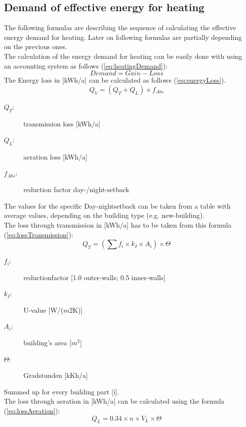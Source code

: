 \subsection{Demand of effective energy for heating}
The following formulas are describing the sequence of calculating the effective energy demand for heating. Later on following formulas are partially depending on the previous ones.\\
The calculation of the energy demand for heating can be easily done with using an accounting system as follows (\ref{eq:heatingDemand}):
\begin{equation}
Demand = Gain - Loss
\label{eq:heatingDemand}
\end{equation}
The Energy loss in [kWh/a] can be calculated as follows (\ref{eq:energyLoss}). 
\begin{equation}
Q_{V} = (Q_T + Q_L) \times f_{Abs}
\label{eq:energyLoss}
\end{equation}
\begin{description}
\item[$Q_{T}$:] transmission loss [kWh/a]
\item[$Q_L$: ]aeration loss [kWh/a]
\item[$f_{Abs}$:] reduction factor day-/night-setback
\end{description}
The values for the specific Day-nightsetback can be taken from a table with average values, depending on the building type (e.g. new-building).\\
The loss through transmission in [kWh/a] has to be taken from this formula (\ref{eq:lossTransmission}):
\begin{equation}
Q_T = (\sum f_i \times k_I \times A_i) \times \Theta 
\label{eq:lossTransmission}
\end{equation}
\begin{description}
\item[$f_i$:]reductionfactor [1.0 outer-walls; 0.5 inner-walls]
\item[$k_I$:] U-value [W/($m2$K)]
\item[$A_i$:] building's area [$m^2$]
\item[$\Theta$:] Gradstunden [kKh/a]
\end{description}
Summed up for every building part [i].\\
The loss through aeration in [kWh/a] can be calculated using the formula (\ref{eq:lossAeration}):
\begin{equation}
Q_L = 0.34 \times n \times V_L \times \Theta 
\label{eq:lossAeration}
\end{equation}
